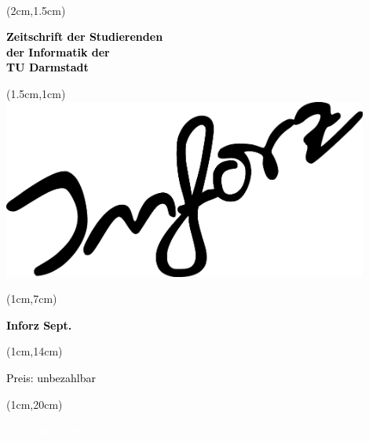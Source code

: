 \begin{titlepage}~


    \begin{textblock*}{12cm}(2cm,1.5cm)
        \begin{flushleft}
            \large\sffamily\textbf{
                \newline
                \textcolor{black}{Zeitschrift der Studierenden\\
                    der Informatik der \\
                    TU Darmstadt} }
        \end{flushleft}
    \end{textblock*}


    \begin{textblock*}{12cm}(1.5cm,1cm)
        \includegraphics[width=12cm]{grafik/inforz}
    \end{textblock*}


    \begin{textblock*}{5cm}(1cm,7cm)
        \begin{rotate}{90}
            \sffamily\huge\textbf{
                \textcolor{black}{Inforz Sept. \the\year}}
        \end{rotate}
    \end{textblock*}


    \begin{textblock*}{2cm}(1cm,14cm)
        \begin{rotate}{90}
            \textcolor{black}{\sffamily\small Preis: unbezahlbar}
        \end{rotate}
    \end{textblock*}


    \begin{textblock*}{2cm}(1cm,20cm)
        \begin{rotate}{90}
            \textcolor{white}{\sffamily ISSN: 1614-4295}
        \end{rotate}
    \end{textblock*}

\end{titlepage}
\newpage
